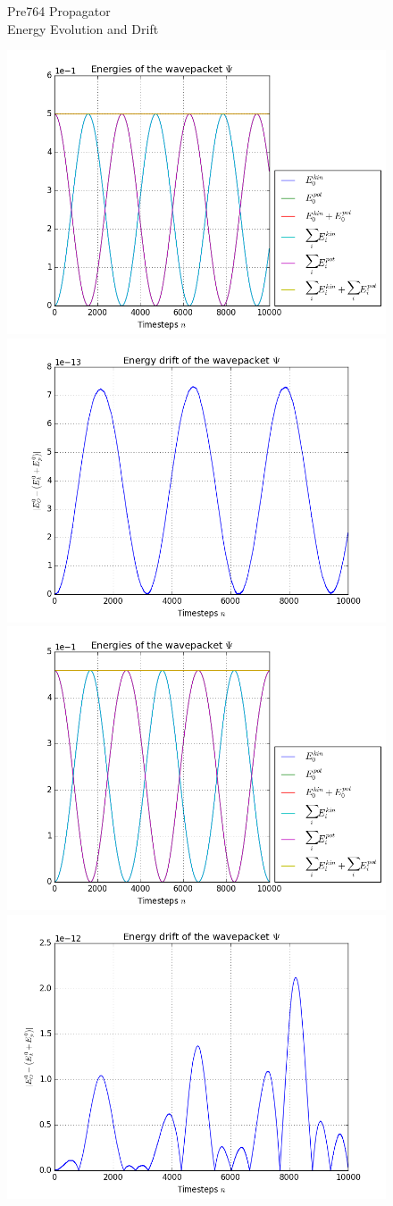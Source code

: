 \begin{figure}[ht]
	\centering
	\begin{minipage}[c]{\textwidth}
		\begin{center}
			\large Pre764 Propagator \\[1mm]
			\normalsize Energy Evolution and Drift
			\vspace{4mm}
		\end{center}
	\end{minipage}
	\includegraphics[width=.45\textwidth]{figures/harmonic_1D_Pre764_energies.png}
	\includegraphics[width=.45\textwidth]{figures/harmonic_1D_Pre764_drift.png} \\
	\includegraphics[width=.45\textwidth]{figures/torsional_1D_Pre764_energies.png}
	\includegraphics[width=.45\textwidth]{figures/torsional_1D_Pre764_drift.png} \\

\end{figure}
